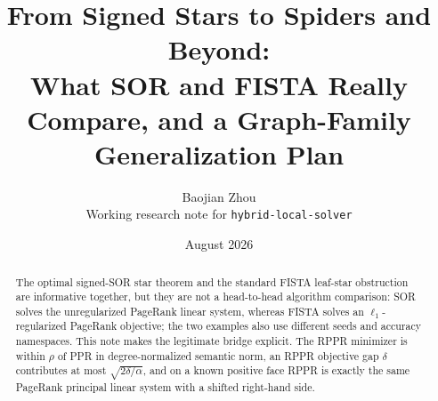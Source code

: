 \documentclass[11pt]{article}
\title{From Signed Stars to Spiders and Beyond:\\
What SOR and FISTA Really Compare, and a Graph-Family Generalization Plan}
\author{Baojian Zhou\\
\small Working research note for \texttt{hybrid-local-solver}}
\date{August 2026}
\begin{document}
\maketitle

\begin{abstract}
The optimal signed-SOR star theorem and the standard FISTA leaf-star
obstruction are informative together, but they are not a head-to-head
algorithm comparison: SOR solves the unregularized PageRank linear system,
whereas FISTA solves an $\ell_1$-regularized PageRank objective; the two
examples also use different seeds and accuracy namespaces.  This note makes
the legitimate bridge explicit.  The RPPR minimizer is within $\rho$ of PPR
in degree-normalized semantic norm, an RPPR objective gap $\delta$ contributes
at most $\sqrt{2\delta/\alpha}$, and on a known positive face RPPR is exactly
the same PageRank principal linear system with a shifted right-hand side.


\end{abstract}
\end{document}
